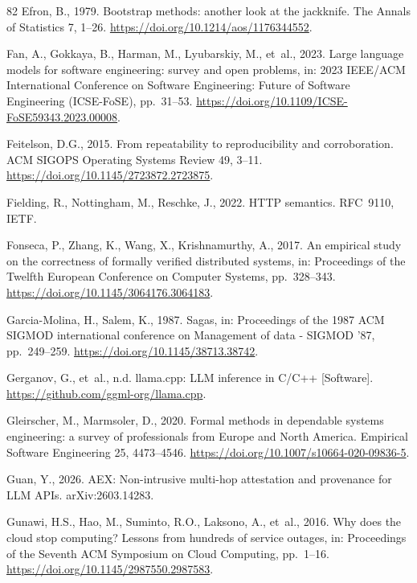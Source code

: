 \documentclass[preprint,3p,authoryear,12pt]{elsarticle}
\begin{document}
\begin{thebibliography}{82}
Efron, B., 1979. Bootstrap methods: another look at the jackknife. The Annals of Statistics 7, 1--26. \url{https://doi.org/10.1214/aos/1176344552}.

Fan, A., Gokkaya, B., Harman, M., Lyubarskiy, M., et~al., 2023. Large language models for software engineering: survey and open problems, in: 2023 IEEE/ACM International Conference on Software Engineering: Future of Software Engineering (ICSE-FoSE), pp.~31--53. \url{https://doi.org/10.1109/ICSE-FoSE59343.2023.00008}.

Feitelson, D.G., 2015. From repeatability to reproducibility and corroboration. ACM SIGOPS Operating Systems Review 49, 3--11. \url{https://doi.org/10.1145/2723872.2723875}.

Fielding, R., Nottingham, M., Reschke, J., 2022. HTTP semantics. RFC~9110, IETF.

Fonseca, P., Zhang, K., Wang, X., Krishnamurthy, A., 2017. An empirical study on the correctness of formally verified distributed systems, in: Proceedings of the Twelfth European Conference on Computer Systems, pp.~328--343. \url{https://doi.org/10.1145/3064176.3064183}.

Garcia-Molina, H., Salem, K., 1987. Sagas, in: Proceedings of the 1987 ACM SIGMOD international conference on Management of data  - SIGMOD '87, pp.~249--259. \url{https://doi.org/10.1145/38713.38742}.

Gerganov, G., et~al., n.d. llama.cpp: LLM inference in C/C++ [Software].
\url{https://github.com/ggml-org/llama.cpp}.

Gleirscher, M., Marmsoler, D., 2020. Formal methods in dependable systems engineering: a survey of professionals from Europe and North America. Empirical Software Engineering 25, 4473--4546. \url{https://doi.org/10.1007/s10664-020-09836-5}.

Guan, Y., 2026. AEX: Non-intrusive multi-hop attestation and provenance for LLM APIs.
arXiv:2603.14283.

Gunawi, H.S., Hao, M., Suminto, R.O., Laksono, A., et~al., 2016. Why does the cloud stop computing? Lessons from hundreds of service outages, in: Proceedings of the Seventh ACM Symposium on Cloud Computing, pp.~1--16. \url{https://doi.org/10.1145/2987550.2987583}.


\end{thebibliography}
\end{document}
